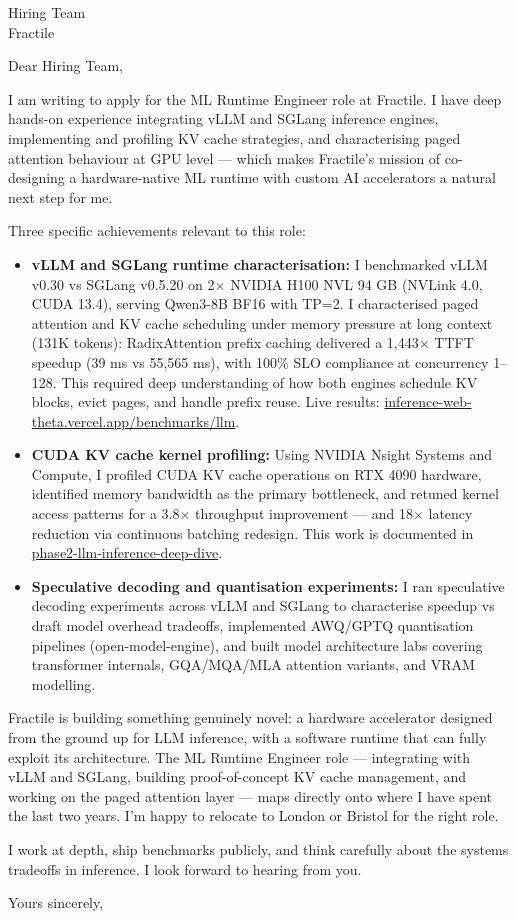 \documentclass[a4paper]{letter}
\date{\today}
\begin{document}
\begin{letter}{Hiring Team \\ Fractile}

\opening{Dear Hiring Team,}

I am writing to apply for the ML Runtime Engineer role at Fractile. I have deep hands-on experience integrating vLLM and SGLang inference engines, implementing and profiling KV cache strategies, and characterising paged attention behaviour at GPU level — which makes Fractile's mission of co-designing a hardware-native ML runtime with custom AI accelerators a natural next step for me.

Three specific achievements relevant to this role:

\begin{itemize}
  \item \textbf{vLLM and SGLang runtime characterisation:} I benchmarked vLLM v0.30 vs SGLang v0.5.20 on 2$\times$ NVIDIA H100 NVL 94 GB (NVLink 4.0, CUDA 13.4), serving Qwen3-8B BF16 with TP=2. I characterised paged attention and KV cache scheduling under memory pressure at long context (131K tokens): RadixAttention prefix caching delivered a 1,443$\times$ TTFT speedup (39 ms vs 55,565 ms), with 100\% SLO compliance at concurrency 1--128. This required deep understanding of how both engines schedule KV blocks, evict pages, and handle prefix reuse. Live results: \href{https://inference-web-theta.vercel.app/benchmarks/llm}{inference-web-theta.vercel.app/benchmarks/llm}.
  \item \textbf{CUDA KV cache kernel profiling:} Using NVIDIA Nsight Systems and Compute, I profiled CUDA KV cache operations on RTX 4090 hardware, identified memory bandwidth as the primary bottleneck, and retuned kernel access patterns for a 3.8$\times$ throughput improvement — and 18$\times$ latency reduction via continuous batching redesign. This work is documented in \href{https://github.com/AyeniOluwatosinOlawale/phase2-llm-inference-deep-dive}{phase2-llm-inference-deep-dive}.
  \item \textbf{Speculative decoding and quantisation experiments:} I ran speculative decoding experiments across vLLM and SGLang to characterise speedup vs draft model overhead tradeoffs, implemented AWQ/GPTQ quantisation pipelines (open-model-engine), and built model architecture labs covering transformer internals, GQA/MQA/MLA attention variants, and VRAM modelling.
\end{itemize}

Fractile is building something genuinely novel: a hardware accelerator designed from the ground up for LLM inference, with a software runtime that can fully exploit its architecture. The ML Runtime Engineer role — integrating with vLLM and SGLang, building proof-of-concept KV cache management, and working on the paged attention layer — maps directly onto where I have spent the last two years. I'm happy to relocate to London or Bristol for the right role.

I work at depth, ship benchmarks publicly, and think carefully about the systems tradeoffs in inference. I look forward to hearing from you.

\closing{Yours sincerely,}

\end{letter}
\end{document}
